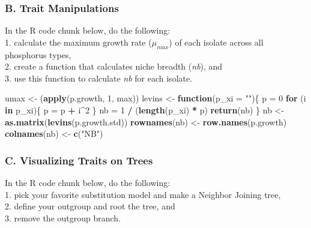 \documentclass[]{article}
\newenvironment{Shaded}{\begin{snugshade}}{\end{snugshade}}
\newcommand{\KeywordTok}[1]{\textcolor[rgb]{0.13,0.29,0.53}{\textbf{#1}}}
\newcommand{\DataTypeTok}[1]{\textcolor[rgb]{0.13,0.29,0.53}{#1}}
\newcommand{\DecValTok}[1]{\textcolor[rgb]{0.00,0.00,0.81}{#1}}
\newcommand{\StringTok}[1]{\textcolor[rgb]{0.31,0.60,0.02}{#1}}
\newcommand{\ControlFlowTok}[1]{\textcolor[rgb]{0.13,0.29,0.53}{\textbf{#1}}}
\newcommand{\OperatorTok}[1]{\textcolor[rgb]{0.81,0.36,0.00}{\textbf{#1}}}
\newcommand{\NormalTok}[1]{#1}
\begin{document}
\subsubsection{B. Trait Manipulations}\label{b.-trait-manipulations}

In the R code chunk below, do the following:\\
1. calculate the maximum growth rate (\(\mu_{max}\)) of each isolate
across all phosphorus types,\\
2. create a function that calculates niche breadth (\emph{nb}), and\\
3. use this function to calculate \emph{nb} for each isolate.

\begin{Shaded}
\begin{Highlighting}[]
\NormalTok{umax <-}\StringTok{ }\NormalTok{(}\KeywordTok{apply}\NormalTok{(p.growth, }\DecValTok{1}\NormalTok{, max))}
\NormalTok{levins <-}\StringTok{ }\ControlFlowTok{function}\NormalTok{(}\DataTypeTok{p_xi =} \StringTok{""}\NormalTok{)\{}
\NormalTok{  p =}\StringTok{ }\DecValTok{0}
  \ControlFlowTok{for}\NormalTok{ (i }\ControlFlowTok{in}\NormalTok{ p_xi)\{}
\NormalTok{    p =}\StringTok{ }\NormalTok{p }\OperatorTok{+}\StringTok{ }\NormalTok{i}\OperatorTok{^}\DecValTok{2}
\NormalTok{  \}}
\NormalTok{  nb =}\StringTok{ }\DecValTok{1} \OperatorTok{/}\StringTok{ }\NormalTok{(}\KeywordTok{length}\NormalTok{(p_xi) }\OperatorTok{*}\StringTok{ }\NormalTok{p)}
  \KeywordTok{return}\NormalTok{(nb)}
\NormalTok{\}}
\NormalTok{nb <-}\StringTok{ }\KeywordTok{as.matrix}\NormalTok{(}\KeywordTok{levins}\NormalTok{(p.growth.std))}
\KeywordTok{rownames}\NormalTok{(nb) <-}\StringTok{ }\KeywordTok{row.names}\NormalTok{(p.growth)}
\KeywordTok{colnames}\NormalTok{(nb) <-}\StringTok{ }\KeywordTok{c}\NormalTok{(}\StringTok{"NB"}\NormalTok{)}
\end{Highlighting}
\end{Shaded}

\subsubsection{C. Visualizing Traits on
Trees}\label{c.-visualizing-traits-on-trees}

In the R code chunk below, do the following:\\
1. pick your favorite substitution model and make a Neighbor Joining
tree,\\
2. define your outgroup and root the tree, and\\
3. remove the outgroup branch.
\end{document}

